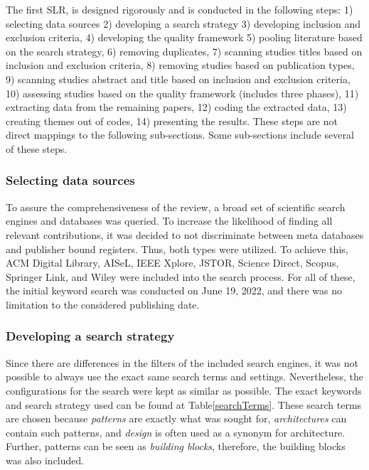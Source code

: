 \documentclass{bmcart}
\begin{document}
The first SLR, is designed rigorously and is conducted in the following steps: 1) selecting data sources 2) developing a search strategy 3) developing inclusion and exclusion criteria, 4) developing the quality framework 5) pooling literature based on the search strategy, 6) removing duplicates, 7) scanning studies titles based on inclusion and exclusion criteria, 8) removing studies based on publication types, 9) scanning studies abstract and title based on inclusion and exclusion criteria, 10) assessing studies based on the quality framework (includes three phases), 11) extracting data from the remaining papers, 12) coding the extracted data, 13) creating themes out of codes, 14) presenting the results. These steps are not direct mappings to the following sub-sections. Some sub-sections include several of these steps.


\subsubsection{Selecting data sources}

To assure the comprehensiveness of the review, a broad set of scientific search engines and databases was queried. To increase the likelihood of finding all relevant contributions, it was decided to not discriminate between meta databases and publisher bound registers. Thus, both types were utilized. To achieve this, ACM Digital Library, AISeL, IEEE Xplore, JSTOR, Science Direct, Scopus, Springer Link, and Wiley were included into the search process. For all of these, the initial keyword search was conducted on June 19, 2022, and there was no limitation to the considered publishing date.

\subsubsection{Developing a search strategy}

Since there are differences in the filters of the included search engines, it was not possible to always use the exact same search terms and settings. Nevertheless, the configurations for the search were kept as similar as possible. The exact keywords and search strategy used can be found at Table\ref{searchTerms}. These search terms are chosen because \emph{patterns} are exactly what was sought for, \emph{architectures} can contain such patterns, and \emph{design} is often used as a synonym for architecture. Further, patterns can be seen as \emph{building blocks}, therefore, the building blocks was also included. 
\end{document}
